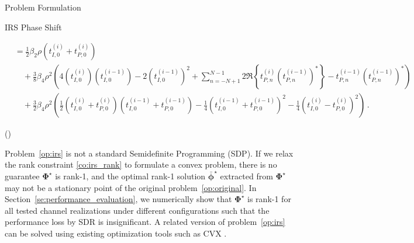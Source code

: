 \documentclass[journal]{IEEEtran}
\begin{document}
\begin{section}{Problem Formulation}
\begin{subsection}{IRS Phase Shift}
\begin{figure*}[b]
\begin{align}
					& = \frac{1}{2}{\beta_2}{\rho}(t_{I,0}^{(i)}+t_{P,0}^{(i)})\nonumber\\
					& \quad + \frac{3}{8}{\beta_4}{\rho^2} \left(4 (t_{I,0}^{(i)})(t_{I,0}^{(i-1)}) - 2 (t_{I,0}^{(i-1)})^2 + \sum_{n=-N+1}^{N-1}{2 \Re\left\{t_{P,n}^{(i)} (t_{P,n}^{(i-1)})^*\right\} - t_{P,n}^{(i-1)} (t_{P,n}^{(i-1)})^*}\right)\nonumber\\
					& \quad + \frac{3}{2}{\beta_4}{\rho^2} \left(\frac{1}{2}(t_{I,0}^{(i)} + t_{P,0}^{(i)})(t_{I,0}^{(i-1)} + t_{P,0}^{(i-1)}) - \frac{1}{4}(t_{I,0}^{(i-1)} + t_{P,0}^{(i-1)})^2 - \frac{1}{4}(t_{I,0}^{(i)} - t_{P,0}^{(i)})^2\right)\,.\label{eq:z_irs_approx}
				\end{align}
			\end{figure*}
			\begin{maxi!}
				{\boldsymbol{\Phi}}{(\boldsymbol{\Phi})}{\label{op:irs}}{\label{ob:irs}}
				\label{co:irs_rate}
				\label{co:irs_modulus}
			\end{maxi!}
			Problem~\ref{op:irs} is not a standard Semidefinite Programming (SDP). If we relax the rank constraint \ref{co:irs_rank} to formulate a convex problem, there is no guarantee $\boldsymbol{\Phi}^{\star}$ is rank-\num{1}, and the optimal rank-\num{1} solution $\bar{\boldsymbol{\phi}}^{\star}$ extracted from $\boldsymbol{\Phi}^{\star}$ may not be a stationary point of the original problem~\ref{op:original}. In Section~\ref{se:performance_evaluation}, we numerically show that $\boldsymbol{\Phi}^{\star}$ is rank-\num{1} for all tested channel realizations under different configurations such that the performance loss by SDR is insignificant. A related version of problem~\ref{op:irs} can be solved using existing optimization tools such as CVX \cite{Grant2013}.


\end{subsection}
\end{section}
\end{document}
